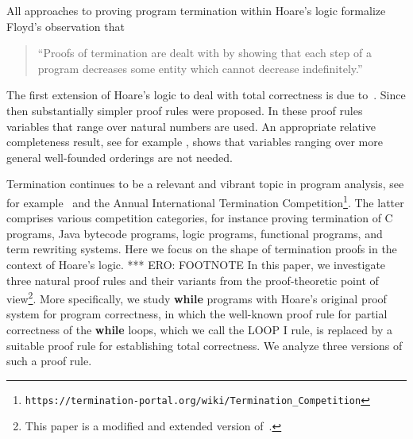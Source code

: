\documentclass[manuscript, screen, review]{acmart}
\begin{document}
All approaches to proving program termination within Hoare’s logic formalize 
Floyd’s \cite{Flo67a} observation that
    \begin{quote}
    ``Proofs of termination are dealt with by showing that each step of a program 
      decreases some entity which cannot decrease indefinitely.”
    \end{quote}

The first extension of Hoare's logic
to deal with total correctness is due to~\cite{MP74}. 
Since then substantially simpler proof rules were proposed.
In these proof rules variables that range over natural numbers are used.
An appropriate relative completeness result, see for example \cite{ABO09}, 
shows that variables ranging over more general well-founded orderings 
are not needed.

Termination continues to be a relevant and vibrant topic in program
analysis, see for example~\cite{CookPR11} and the Annual International
Termination Competition\footnote{
\texttt{https://termination-portal.org/wiki/Termination\_Competition}}.
The latter comprises various competition categories, 
for instance proving termination of 
C programs, Java bytecode programs, logic programs,
functional programs, and term rewriting systems.
Here we focus on the shape of termination proofs in the context of
Hoare's logic. 
*** ERO: FOOTNOTE
In this paper, we investigate three natural proof rules and their variants
from the proof-theoretic point of view\footnote{This paper 
 is a modified and extended version of~\cite{ABO25}.}.
More specifically, we study {\bf while} programs with Hoare's 
original proof system for program correctness, in which the well-known
proof rule for partial correctness of the {\bf while} loops, which we
call the LOOP I rule, is replaced by a suitable proof rule for
establishing total correctness.  We analyze three versions of such a
proof rule. 


\medskip
\end{document}
